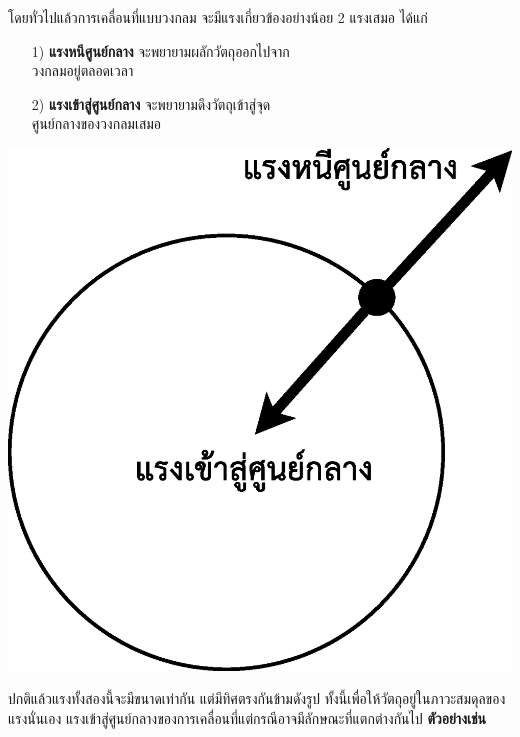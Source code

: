 \begin{minipage}{.65\textwidth}
โดยทั่วไปแล้วการเคลื่อนที่แบบวงกลม จะมีแรงเกี่ยวข้องอย่างน้อย  2  แรงเสมอ  ได้แก่
\begin{itemize}[leftmargin=*]
	\item[1)] \textbf{แรงหนีศูนย์กลาง}  จะพยายามผลักวัตถุออกไปจาก\\วงกลมอยู่ตลอดเวลา
	\item[2)] \textbf{แรงเข้าสู่ศูนย์กลาง}   จะพยายามดึงวัตถุเข้าสู่จุด\\ศูนย์กลางของวงกลมเสมอ	
\end{itemize}
\end{minipage} \hfill
\begin{adjustbox}{valign=c} 
    \begin{minipage}[c]{.3\linewidth}
        \includegraphics[width=\linewidth]{content-12.eps}
    \end{minipage}
\end{adjustbox}
\tcblower
ปกติแล้วแรงทั้งสองนี้จะมีขนาดเท่ากัน แต่มีทิศตรงกันข้ามดังรูป   ทั้งนี้เพื่อให้วัตถุอยู่ในภาวะสมดุลของแรงนั่นเอง แรงเข้าสู่ศูนย์กลางของการเคลื่อนที่แต่กรณีอาจมีลักษณะที่แตกต่างกันไป   \textbf{ตัวอย่างเช่น}
